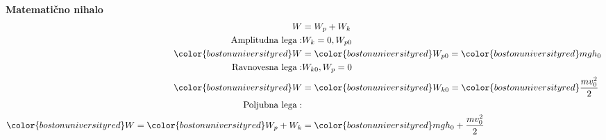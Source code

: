 \\
\textbf{Matematično nihalo}\\
\begin{align*}
	W &= W_p + W_k\\
	\text{Amplitudna lega}:& W_k = 0, W_{p0}\\
	{\color{bostonuniversityred}W} &= {\color{bostonuniversityred}W_{p0}} = {\color{bostonuniversityred}mgh_0}\\
	\text{Ravnovesna lega}:& W_{k0}, W_p = 0\\
	{\color{bostonuniversityred}W} &= {\color{bostonuniversityred}W_{k0}} = {\color{bostonuniversityred}\frac{mv_0^2}{2}}\\
	\text{Poljubna lega}:&\\
	{\color{bostonuniversityred}W} = {\color{bostonuniversityred}W_{p} + W_{k}} &= {\color{bostonuniversityred}mgh_0 + \frac{mv_0^2}{2}}\\
\end{align*}